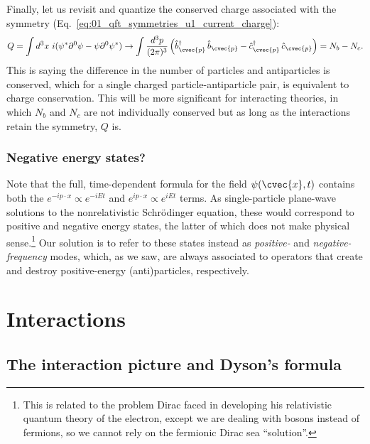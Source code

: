 Finally, let us revisit and quantize the conserved charge associated with the \UU[1] symmetry (Eq.~\ref{eq:01_qft_symmetries_u1_current_charge}):
\begin{equation}
    \label{eq:01_qft_quantization_complex_charge}
    Q = \int d^3x\ i(\psi^*\partial^0\psi - \psi\partial^0\psi^*) \rightarrow \int \frac{d^3p}{(2\pi)^3} \left(\hat b^\dagger_{\cvec{p}}\,\hat b_{\cvec{p}} - \hat c^\dagger_{\cvec{p}}\,\hat c_{\cvec{p}}\right) = N_b - N_c.
\end{equation}
This is saying the difference in the number of particles and antiparticles is conserved, which for a single charged particle-antiparticle pair, is equivalent to charge conservation.
This will be more significant for interacting theories, in which $N_b$ and $N_c$ are not individually conserved but as long as the interactions retain the \UU[1] symmetry, $Q$ is.

\subsubsection{Negative energy states?} 

Note that the full, time-dependent formula for the field $\psi(\cvec{x}, t)$ contains both the $e^{-ip\cdot x}\propto e^{-iEt}$ and $e^{ip\cdot x}\propto e^{iEt}$ terms.
As single-particle plane-wave solutions to the nonrelativistic Schr\"odinger equation, these would correspond to positive and negative energy states, the latter of which does not make physical sense.\footnote{This is related to the problem Dirac faced in developing his relativistic quantum theory of the electron, except we are dealing with bosons instead of fermions, so we cannot rely on the fermionic Dirac sea ``solution''.}
Our solution is to refer to these states instead as \textit{positive-} and \textit{negative-frequency} modes, which, as we saw, are always associated to operators that create and destroy positive-energy (anti)particles, respectively.

\section{Interactions}
\label{app:01_qft_quantization_interactions}

\subsection{The interaction picture and Dyson's formula}
\label{sec:01_qft_quantization_interactions}

